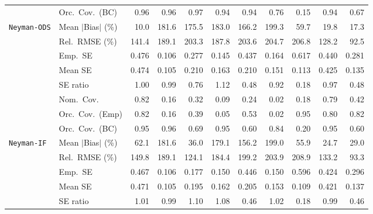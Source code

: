 \begin{landscape}
\begin{longtable}{llrrrrrrrrr}
 & Orc.\ Cov.\ (BC) & \cellcolor{rankone}0.96 & \cellcolor{rankone}0.96 & \cellcolor{ranktwo}0.97 & \cellcolor{rankone}0.94 & \cellcolor{rankone}0.94 & \cellcolor{rankthree}0.76 & 0.15 & \cellcolor{rankone}0.94 & 0.67 \\
\addlinespace[2pt]
\quad \texttt{Neyman-ODS} & Mean $|$Bias$|$ (\%) & \cellcolor{rankone}10.0 & 181.6 & 175.5 & 183.0 & 166.2 & 199.3 & 59.7 & \cellcolor{rankthree}19.8 & \cellcolor{ranktwo}17.3 \\
 & Rel.\ RMSE (\%) & \cellcolor{rankthree}141.4 & 189.1 & 203.3 & 187.8 & 203.6 & 204.7 & 206.8 & \cellcolor{ranktwo}128.2 & \cellcolor{rankone}92.5 \\
 & Emp.\ SE & 0.476 & 0.106 & 0.277 & 0.145 & 0.437 & 0.164 & 0.617 & 0.440 & 0.281 \\
 & Mean SE & 0.474 & 0.105 & 0.210 & 0.163 & 0.210 & 0.151 & 0.113 & 0.425 & 0.135 \\
 & SE ratio & \cellcolor{rankone}1.00 & \cellcolor{ranktwo}0.99 & 0.76 & 1.12 & 0.48 & 0.92 & 0.18 & \cellcolor{rankthree}0.97 & 0.48 \\
 & Nom.\ Cov. & \cellcolor{rankone}0.82 & 0.16 & 0.32 & 0.09 & 0.24 & 0.02 & 0.18 & \cellcolor{ranktwo}0.79 & \cellcolor{rankthree}0.42 \\
 & Orc.\ Cov.\ (Emp) & \cellcolor{ranktwo}0.82 & 0.16 & 0.39 & 0.05 & 0.53 & 0.02 & \cellcolor{rankone}0.95 & \cellcolor{rankthree}0.80 & \cellcolor{ranktwo}0.82 \\
 & Orc.\ Cov.\ (BC) & \cellcolor{ranktwo}0.95 & \cellcolor{ranktwo}0.96 & 0.69 & \cellcolor{rankone}0.95 & 0.60 & \cellcolor{rankthree}0.84 & 0.20 & \cellcolor{rankone}0.95 & 0.60 \\
\addlinespace[2pt]
\quad \texttt{Neyman-IF} & Mean $|$Bias$|$ (\%) & 62.1 & 181.6 & \cellcolor{rankthree}36.0 & 179.1 & 156.2 & 199.0 & 55.9 & \cellcolor{rankone}24.7 & \cellcolor{ranktwo}29.0 \\
 & Rel.\ RMSE (\%) & 149.8 & 189.1 & \cellcolor{ranktwo}124.1 & 184.4 & 199.2 & 203.9 & 208.9 & \cellcolor{rankthree}133.2 & \cellcolor{rankone}93.3 \\
 & Emp.\ SE & 0.467 & 0.106 & 0.177 & 0.150 & 0.446 & 0.150 & 0.596 & 0.424 & 0.296 \\
 & Mean SE & 0.471 & 0.105 & 0.195 & 0.162 & 0.205 & 0.153 & 0.109 & 0.421 & 0.137 \\
 & SE ratio & \cellcolor{rankone}1.01 & \cellcolor{rankone}0.99 & 1.10 & \cellcolor{rankthree}1.08 & 0.46 & \cellcolor{ranktwo}1.02 & 0.18 & \cellcolor{rankone}0.99 & 0.46 \\

\end{longtable}
\end{landscape}
